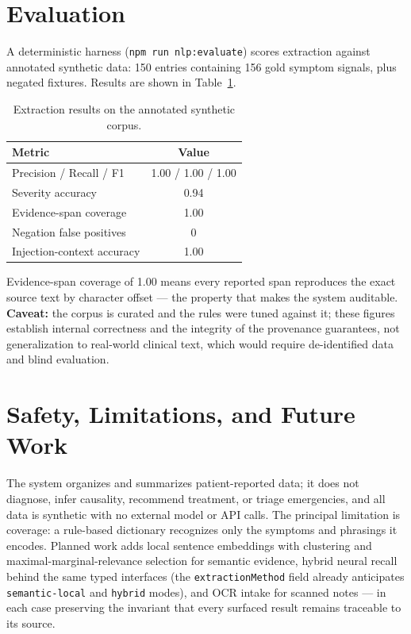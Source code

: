 \documentclass[10pt,twocolumn]{article}
\begin{document}
\section{Evaluation}
A deterministic harness (\texttt{npm run nlp:evaluate}) scores extraction against annotated synthetic data: 150 entries containing 156 gold symptom signals, plus negated fixtures. Results are shown in Table~\ref{tab:results}.

\begin{table}[h]
\centering\small
\caption{Extraction results on the annotated synthetic corpus.}
\label{tab:results}
\begin{tabular}{lc}
\toprule
Metric & Value \\
\midrule
Precision / Recall / F1 & 1.00 / 1.00 / 1.00 \\
Severity accuracy & 0.94 \\
Evidence-span coverage & 1.00 \\
Negation false positives & 0 \\
Injection-context accuracy & 1.00 \\
\bottomrule
\end{tabular}
\end{table}

Evidence-span coverage of 1.00 means every reported span reproduces the exact source text by character offset --- the property that makes the system auditable. \textbf{Caveat:} the corpus is curated and the rules were tuned against it; these figures establish internal correctness and the integrity of the provenance guarantees, not generalization to real-world clinical text, which would require de-identified data and blind evaluation.

\section{Safety, Limitations, and Future Work}
The system organizes and summarizes patient-reported data; it does not diagnose, infer causality, recommend treatment, or triage emergencies, and all data is synthetic with no external model or API calls. The principal limitation is coverage: a rule-based dictionary recognizes only the symptoms and phrasings it encodes. Planned work adds local sentence embeddings with clustering and maximal-marginal-relevance selection for semantic evidence, hybrid neural recall behind the same typed interfaces (the \texttt{extractionMethod} field already anticipates \texttt{semantic-local} and \texttt{hybrid} modes), and OCR intake for scanned notes --- in each case preserving the invariant that every surfaced result remains traceable to its source.
\end{document}
